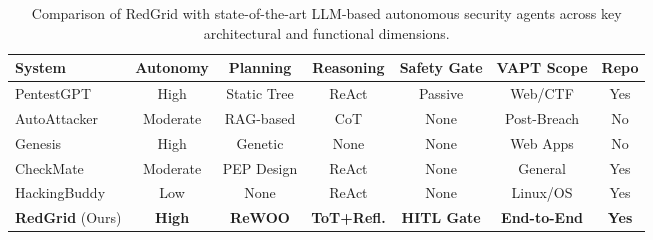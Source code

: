 
\begin{table}[htbp]
  \centering
  \caption{Comparison of RedGrid with state-of-the-art LLM-based autonomous security agents across key architectural and functional dimensions.}
  \label{tab:related-work-comparison}
  \begin{tabular}{lcccccc}
    \toprule
    \textbf{System} & \textbf{Autonomy} & \textbf{Planning} & \textbf{Reasoning} & \textbf{Safety Gate} & \textbf{VAPT Scope} & \textbf{Repo} \\
    \midrule
    PentestGPT \cite{pentestgpt} & High & Static Tree & ReAct & Passive & Web/CTF & Yes \\
    AutoAttacker \cite{autoattacker} & Moderate & RAG-based & CoT & None & Post-Breach & No \\
    Genesis \cite{genesis} & High & Genetic & None & None & Web Apps & No \\
    CheckMate \cite{checkmate} & Moderate & PEP Design & ReAct & None & General & Yes \\
    HackingBuddy \cite{hackingbuddy} & Low & None & ReAct & None & Linux/OS & Yes \\
    \midrule
    \textbf{RedGrid} (Ours) & \textbf{High} & \textbf{ReWOO} & \textbf{ToT+Refl.} & \textbf{HITL Gate} & \textbf{End-to-End} & \textbf{Yes} \\
    \bottomrule
  \end{tabular}
\end{table}
